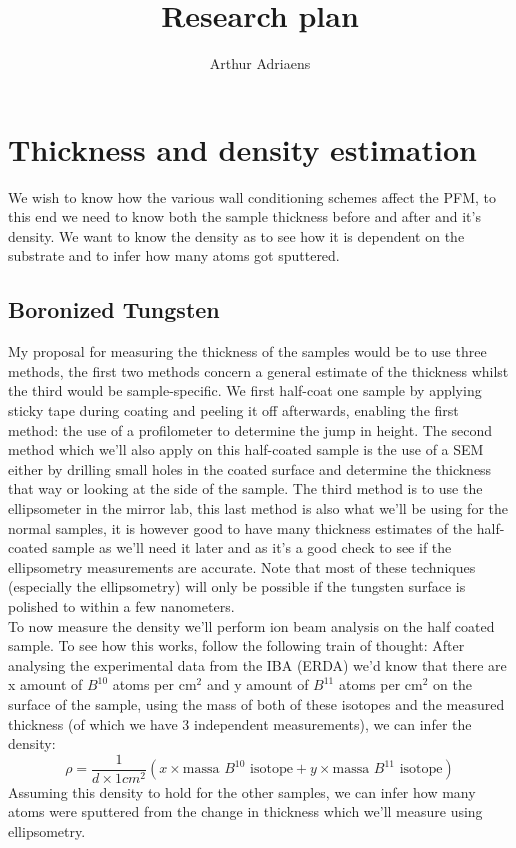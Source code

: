 \documentclass{article}
\title{Research plan}
\author{Arthur Adriaens}
\begin{document}
\maketitle

\section{Thickness and density estimation}
We wish to know how the various wall conditioning schemes affect the PFM, to
this end we need to know both the sample thickness before and after and it's
density.  We want to know the density as to see how it is dependent on the
substrate and to infer how many atoms got sputtered.
\subsection{Boronized Tungsten}
My proposal for measuring the thickness
of the samples would be to use three methods, the first two methods concern a
general estimate of the thickness whilst the third would be sample-specific.
We first half-coat one sample by applying sticky tape during coating and
peeling it off afterwards, enabling the first method: the use of a profilometer
to determine the jump in height. The second method which we'll also apply on
this half-coated sample is the use of a SEM either by drilling small holes in
the coated surface and determine the thickness that way or looking at the side
of the sample.  The third method is to use the ellipsometer in the mirror lab,
this last method is also what we'll be using for the normal samples, it is
however good to have many thickness estimates of the half-coated sample as
we'll need it later and as it's a good check to see if the ellipsometry
measurements are accurate.  Note that most of these techniques (especially the
ellipsometry) will only be possible if the tungsten surface is polished to within
a few nanometers.
 \vspace{0.2cm} \\
To now measure the density we'll perform ion beam analysis on the half coated
sample. To see how this works, follow the following train of thought: After
analysing the experimental data from the IBA (ERDA) we'd know that there are x amount
of $B^{10}$ atoms per cm$^2$ and y amount of $B^{11}$ atoms per cm$^2$ on the
surface of the sample, using the mass of both of these isotopes and the
measured thickness (of which we have 3 independent measurements), we can infer
the density:
\begin{equation}
    \rho = \frac{1}{d \times 1 cm^2} \left( x \times \text{massa }B^{10}   \text{ isotope} + y \times \text{massa }B^{11}   \text{ isotope}\right)
\end{equation}
Assuming this density to hold for the other samples, we can infer how many atoms 
were sputtered from the change in thickness which we'll measure using ellipsometry.
\end{document}
